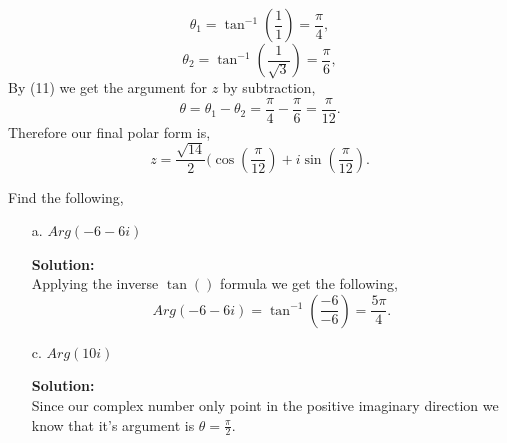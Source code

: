 \documentclass[12pt]{article}
\makeatletter
\theoremstyle{homework}
\newenvironment{exercise}[1]
{\def\@currentlabel{#1}\exercisecore}
{\endexercisecore}
\newcommand{\localhead}[1]{\par\smallskip\noindent\textbf{#1}\nobreak\\}%
\newcommand\solution{\localhead{Solution:}}
\makeatother
\begin{document}
\begin{exercise}{7}
\begin{enumerate}
        \begin{equation*}
            \theta_1 = \tan^{-1}(\frac{1}{1}) = \frac{\pi}{4},
        \end{equation*}
        \begin{equation*}
            \theta_2 = \tan^{-1}(\frac{1}{\sqrt{3}}) = \frac{\pi}{6},
        \end{equation*}
        By (11) we get the argument for $z$ by subtraction, 
        \begin{equation*}
            \theta = \theta_1 - \theta_2 = \frac{\pi}{4} - \frac{\pi}{6} = \frac{\pi}{12}.
        \end{equation*}
        Therefore our final polar form is, 
        \begin{equation*}
            z = \frac{\sqrt{14}}{2}(\cos(\frac{\pi}{12}) + i\sin(\frac{\pi}{12}).
        \end{equation*}
    \end{enumerate}
    
\end{exercise}
\vspace{.5in}




\begin{exercise}{12} Find the following, 
    \begin{enumerate}
        \item[a.] $Arg(-6-6i)$
        \solution Applying the inverse $\tan()$ formula we get the following, 
        \begin{equation*}
            Arg(-6-6i) = \tan^{-1}(\frac{-6}{-6}) = \frac{5\pi}{4}.
        \end{equation*}   
        \item[c.] $Arg(10i)$
        \solution Since our complex number only point in the positive imaginary direction we know that it's argument is $\theta = \frac{\pi}{2}$.  
    \end{enumerate}
\end{exercise}
\vspace{.5in}
\end{document}
